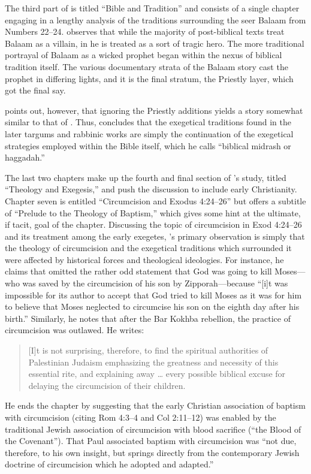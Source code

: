 The third part of  is titled ``Bible and Tradition'' and consists of a single chapter engaging in a lengthy analysis of the traditions surrounding the seer Balaam from Numbers 22--24. \vermes observes that while the majority of post-biblical texts treat Balaam as a villain, in \lab he is treated as a sort of tragic hero.%
    \autocite[173]{vermes1961}
The more traditional portrayal of Balaam as a wicked prophet began within the nexus of biblical tradition itself. The various documentary strata of the Balaam story cast the prophet in differing lights, and it is the final stratum, the Priestly layer, which got the final say.

\vermes points out, however, that ignoring the Priestly additions yields a story somewhat similar to that of \lab. Thus, \vermes concludes that the exegetical traditions found in the later targums and rabbinic works are simply the continuation of the exegetical strategies employed within the Bible itself, which he calls ``biblical midrash or haggadah.''%
    \autocite[176]{vermes1961}

The last two chapters make up the fourth and final section of \vermes's study, titled ``Theology and Exegesis,'' and push the discussion to include early Christianity. Chapter seven is entitled ``Circumcision and Exodus 4:24--26'' but offers a subtitle of ``Prelude to the Theology of Baptism,'' which gives some hint at the ultimate, if tacit, goal of the chapter. Discussing the topic of circumcision in Exod 4:24--26 and its treatment among the early exegetes, \vermes's primary observation is simply that the theology of circumcision and the exegetical traditions which surrounded it were affected by historical forces and theological ideologies. For instance, he claims that \jub omitted the rather odd statement that God was going to kill Moses---who was saved by the circumcision of his son by Zipporah---because ``[i]t was impossible for its author to accept that God tried to kill Moses as it was for him to believe that Moses neglected to circumcise his son on the eighth day after his birth.''%
    \autocite[185]{vermes1961}
Similarly, he notes that after the Bar Kokhba rebellion, the practice of circumcision was outlawed. He writes:
\begin{quote}
    [I]t is not surprising, therefore, to find the spiritual authorities of Palestinian Judaism emphasizing the greatness and necessity of this essential rite, and explaining away \ldots{} every possible biblical excuse for delaying the circumcision of their children.%
        \autocite[189]{vermes1961}
\end{quote}
\noindent
He ends the chapter by suggesting that the early Christian association of baptism with circumcision (citing Rom 4:3--4 and Col 2:11--12) was enabled by the traditional Jewish association of circumcision with blood sacrifice (``the Blood of the Covenant'').%
    \autocite[190]{vermes1961}
That Paul associated baptism with circumcision was ``not due, therefore, to his own insight, but springs directly from the contemporary Jewish doctrine of circumcision which he adopted and adapted.''%
    \autocite[191]{vermes1961} 

